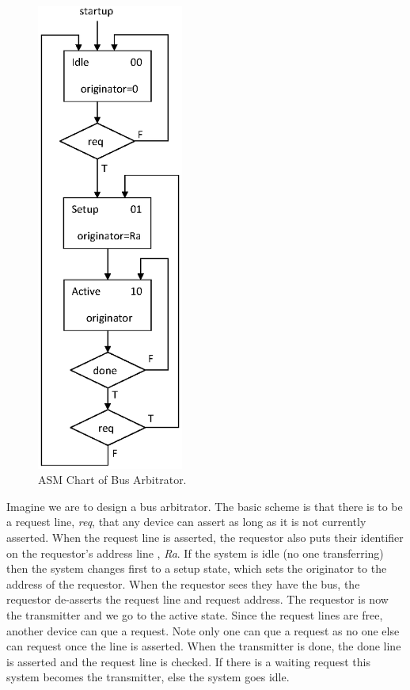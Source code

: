 
\begin{figure}
\vspace*{-.45in}
\begin{center}
\caption{ASM Chart of Bus Arbitrator.}\label{fig-ASM-example}
\includegraphics[width=1.9in]{images/ASM.eps}
\end{center}
\end{figure}

Imagine we are to design a bus arbitrator.  The basic scheme is that there is to be a request line, \emph{req}, that any device can assert as long as it is not currently asserted.  When the request line is asserted, the requestor also puts their identifier on the requestor's address line , \emph{Ra}.  If the system is idle (no one transferring) then the system changes first to a setup state, which sets the originator to the address of the requestor.  When the requestor sees they have the bus, the requestor de-asserts the request line and request address.  The requestor is now the transmitter and we go to the active state.  Since the request lines are free, another device can que a request.  Note only one can que a request as no one else can request once the line is asserted.  When the transmitter is done, the done line is asserted and the request line is checked.  If there is a waiting request this system becomes the transmitter, else the system goes idle.


